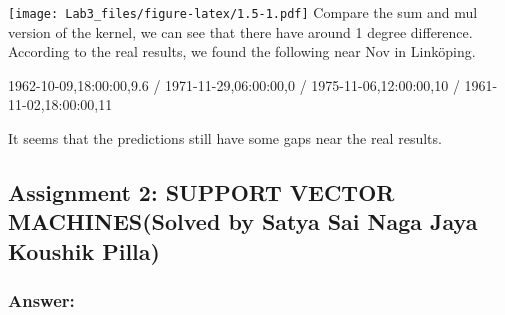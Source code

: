 \documentclass[
]{article}
\newenvironment{Shaded}{\begin{snugshade}}{\end{snugshade}}
\newcommand{\AttributeTok}[1]{\textcolor[rgb]{0.13,0.29,0.53}{#1}}
\newcommand{\ControlFlowTok}[1]{\textcolor[rgb]{0.13,0.29,0.53}{\textbf{#1}}}
\newcommand{\DecValTok}[1]{\textcolor[rgb]{0.00,0.00,0.81}{#1}}
\newcommand{\DocumentationTok}[1]{\textcolor[rgb]{0.56,0.35,0.01}{\textbf{\textit{#1}}}}
\newcommand{\FunctionTok}[1]{\textcolor[rgb]{0.13,0.29,0.53}{\textbf{#1}}}
\newcommand{\NormalTok}[1]{#1}
\newcommand{\OtherTok}[1]{\textcolor[rgb]{0.56,0.35,0.01}{#1}}
\newcommand{\SpecialCharTok}[1]{\textcolor[rgb]{0.81,0.36,0.00}{\textbf{#1}}}
\newcommand{\StringTok}[1]{\textcolor[rgb]{0.31,0.60,0.02}{#1}}
\begin{document}
\begin{Shaded}
\end{Shaded}

\texttt{[image: Lab3\_files/figure-latex/1.5-1.pdf]} Compare the sum and
mul version of the kernel, we can see that there have around 1 degree
difference. According to the real results, we found the following near
Nov in Linköping.

1962-10-09,18:00:00,9.6 / 1971-11-29,06:00:00,0 / 1975-11-06,12:00:00,10
/ 1961-11-02,18:00:00,11

It seems that the predictions still have some gaps near the real
results.

\subsection{Assignment 2: SUPPORT VECTOR MACHINES(Solved by Satya Sai
Naga Jaya Koushik
Pilla)}\label{assignment-2-support-vector-machinessolved-by-satya-sai-naga-jaya-koushik-pilla}

\subsubsection{Answer:}\label{answer-1}
\end{document}
